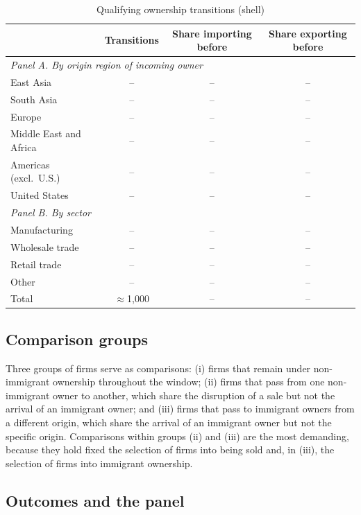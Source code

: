 \documentclass[12pt]{article}
\theoremstyle{remark}
\begin{document}
\begin{table}[htbp]\centering\small
\caption{Qualifying ownership transitions (shell)}
\label{tab:switches}
\begin{tabular}{lccc}
\toprule
 & Transitions & Share importing before & Share exporting before\\
\midrule
\multicolumn{4}{l}{\textit{Panel A. By origin region of incoming owner}}\\
\quad East Asia & -- & -- & -- \\
\quad South Asia & -- & -- & -- \\
\quad Europe & -- & -- & -- \\
\quad Middle East and Africa & -- & -- & -- \\
\quad Americas (excl.\ U.S.) & -- & -- & -- \\
\quad United States & -- & -- & -- \\
\multicolumn{4}{l}{\textit{Panel B. By sector}}\\
\quad Manufacturing & -- & -- & -- \\
\quad Wholesale trade & -- & -- & -- \\
\quad Retail trade & -- & -- & -- \\
\quad Other & -- & -- & -- \\
\midrule
Total & $\approx$1,000 & -- & -- \\
\bottomrule
\end{tabular}
\end{table}

\subsection{Comparison groups}

Three groups of firms serve as comparisons: (i) firms that remain under
non-immigrant ownership throughout the window; (ii) firms that pass from one
non-immigrant owner to another, which share the disruption of a sale but not
the arrival of an immigrant owner; and (iii) firms that pass to immigrant
owners from a different origin, which share the arrival of an immigrant owner
but not the specific origin. Comparisons within groups (ii) and (iii) are the
most demanding, because they hold fixed the selection of firms into being sold
and, in (iii), the selection of firms into immigrant ownership.

\subsection{Outcomes and the panel}
\end{document}
